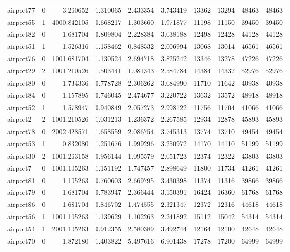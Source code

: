 \begin{longtable}{|l|r|r|r|r|r|r|r|r|r|}
airport77 & 0 & 3.260652 & 1.310065 & 2.433354 & 3.743419 & 13362 & 13294 & 48463 & 48463 \\
airport55 & 1 & 4000.842105 & 0.668217 & 1.303660 & 1.971877 & 11198 & 11150 & 39450 & 39450 \\
airport82 & 0 & 1.681704 & 0.809804 & 2.228384 & 3.038188 & 12498 & 12428 & 44128 & 44128 \\
airport51 & 1 & 1.526316 & 1.158462 & 0.848532 & 2.006994 & 13068 & 13014 & 46561 & 46561 \\
airport76 & 0 & 1001.681704 & 1.130524 & 2.694718 & 3.825242 & 13346 & 13278 & 47226 & 47226 \\
airport29 & 2 & 1001.210526 & 1.503441 & 1.081343 & 2.584784 & 14384 & 14332 & 52976 & 52976 \\
airport80 & 0 & 1.734336 & 0.778728 & 2.306262 & 3.084990 & 11710 & 11642 & 40938 & 40938 \\
airport84 & 0 & 1.157895 & 0.746045 & 2.474677 & 3.220722 & 13632 & 13572 & 48918 & 48918 \\
airport52 & 1 & 1.578947 & 0.940849 & 2.057273 & 2.998122 & 11756 & 11704 & 41066 & 41066 \\
airport2 & 2 & 1001.210526 & 1.031213 & 1.236372 & 2.267585 & 12934 & 12878 & 45893 & 45893 \\
airport78 & 0 & 2002.428571 & 1.658559 & 2.086754 & 3.745313 & 13774 & 13710 & 49454 & 49454 \\
airport53 & 1 & 0.832080 & 1.251676 & 1.999296 & 3.250972 & 14170 & 14110 & 51199 & 51199 \\
airport30 & 2 & 1001.263158 & 0.956144 & 1.095579 & 2.051723 & 12374 & 12322 & 43803 & 43803 \\
airport7 & 0 & 1001.105263 & 1.151192 & 1.747457 & 2.898649 & 11800 & 11734 & 41261 & 41261 \\
airport81 & 0 & 1.105263 & 0.760603 & 2.669795 & 3.430398 & 11374 & 11316 & 39866 & 39866 \\
airport79 & 0 & 1.681704 & 0.783947 & 2.366444 & 3.150391 & 16424 & 16360 & 61768 & 61768 \\
airport86 & 0 & 1.681704 & 0.846792 & 1.474555 & 2.321347 & 12372 & 12316 & 44618 & 44618 \\
airport56 & 1 & 1001.105263 & 1.139629 & 1.102263 & 2.241892 & 15112 & 15042 & 54314 & 54314 \\
airport54 & 1 & 2001.105263 & 0.912355 & 2.580389 & 3.492744 & 12164 & 12100 & 42648 & 42648 \\
airport70 & 0 & 1.872180 & 1.403822 & 5.497616 & 6.901438 & 17278 & 17200 & 64999 & 64999 \\

\end{longtable}
